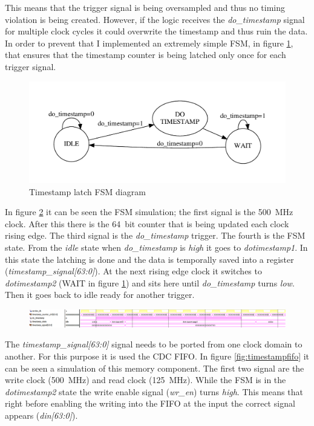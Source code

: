 This means that the trigger signal is being oversampled and thus no timing violation is being created.
However, if the logic receives the \textit{do\_timestamp} signal for multiple clock cycles it could overwrite the timestamp and thus ruin the data.
In order to prevent that I implemented an extremely simple FSM, in figure \ref{fig:timestampFSM}, that ensures that the timestamp counter is being latched only once for each trigger signal.
\begin{figure}[H]
	\centering
	\includegraphics[width=0.85\linewidth]{FSMdiagrams/timestampFSM.pdf}
	\caption{Timestamp latch FSM diagram}
	\label{fig:timestampFSM}
\end{figure}
\noindent In figure \ref{fig:timestampfsm} it can be seen the FSM simulation; the first signal is the 500~MHz clock. After this there is the 64~bit counter that is being updated each clock rising edge. The third signal is the \textit{do\_timestamp} trigger. The fourth is the FSM state.
From the \textit{idle} state when \textit{do\_timestamp} is \textit{high} it goes to \textit{dotimestamp1}. In this state the latching is done and the data is temporally saved into a register (\textit{timestamp\_signal[63:0]}). At the next rising edge clock it switches to \textit{dotimestamp2} (WAIT in figure \ref{fig:timestampFSM}) and sits here until \textit{do\_timestamp} turns \textit{low}. Then it goes back to idle ready for another trigger.
\begin{figure}[H]
	\centering
	\includegraphics[width=1.0\linewidth]{IMG/ch4/TIMESTAMPsimulations/TIMESTAMPFSM}
	\caption{}
	\label{fig:timestampfsm}
\end{figure}
\noindent The \textit{timestamp\_signal[63:0]} signal needs to be ported from one clock domain to another. For this purpose it is used the CDC FIFO.
In figure \ref{fig:timestampfifo} it can be seen a simulation of this memory component. 
The first two signal are the write clock (500~MHz) and read clock (125~MHz). While the FSM is in the \textit{dotimestamp2} state the write enable signal (\textit{wr\_en}) turns \textit{high}. This means that right before enabling the writing into the FIFO at the input the correct signal appears (\textit{din[63:0]}). 
